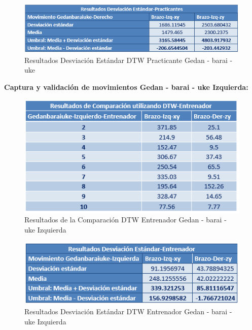 \begin{figure}[H]%
	\begin{center}
		\includegraphics[scale=1]{./Figuras/Implementacion/Pruebas/Tablas/ResultadorDesvEstandar_Practicante_Gedanbaraiuke}
	\end{center}
	\caption{Resultados Desviación Estándar DTW Practicante Gedan - barai - uke}
	\label{fig:ResultadorDesvEstandar_Practicante_Gedanbaraiuke}
\end{figure}
\textbf{Captura y validación de movimientos Gedan - barai - uke Izquierda:}\\
\begin{figure}[H]%
	\begin{center}
		\includegraphics[scale=1]{./Figuras/Implementacion/Pruebas/Tablas/ResultadosDTW_Entrenador_Gedanbaraiuke-Izquierdo}
	\end{center}
	\caption{Resultados de la Comparación DTW Entrenador Gedan - barai - uke Izquierda}
	\label{fig:ResultadosDTW_Entrenador_Gedanbaraiuke-Izquierdo}
\end{figure}
\begin{figure}[H]%
	\begin{center}
		\includegraphics[scale=1]{./Figuras/Implementacion/Pruebas/Tablas/ResultadorDesvEstandar_Entrenador_Gedanbaraiuke-Izquierdo}
	\end{center}
	\caption{Resultados Desviación Estándar DTW Entrenador Gedan - barai - uke Izquierda}
	\label{fig:ResultadorDesvEstandar_Entrenador_Gedanbaraiuke-Izquierdo}
\end{figure}
\clearpage

